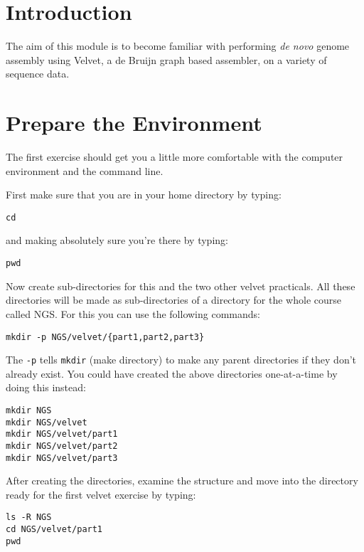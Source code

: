 \newpage

\section{Introduction}
The aim of this module is to become familiar with performing \textit{de novo}
genome assembly using Velvet, a de Bruijn graph based assembler, on a variety of
sequence data.

\section{Prepare the Environment}
\begin{information}
The first exercise should get you a little more comfortable with the computer
environment and the command line.
\end{information}

\begin{steps}
First make sure that you are in your home directory by typing:
\begin{lstlisting}
cd
\end{lstlisting}

and making absolutely sure you're there by typing:
\begin{lstlisting}
pwd
\end{lstlisting}

Now create sub-directories for this and the two other velvet practicals. All
these directories will be made as sub-directories of a directory for the whole
course called NGS. For this you can use the following commands:
\begin{lstlisting}
mkdir -p NGS/velvet/{part1,part2,part3}
\end{lstlisting}
\end{steps}

\begin{information}
The \texttt{-p} tells \texttt{mkdir} (make directory) to make any parent
directories if they don't already exist. You could have created the above directories one-at-a-time
by doing this instead:
\begin{lstlisting}
mkdir NGS
mkdir NGS/velvet
mkdir NGS/velvet/part1
mkdir NGS/velvet/part2
mkdir NGS/velvet/part3
\end{lstlisting}
\end{information}

\begin{steps}
After creating the directories, examine the structure and move into the
directory ready for the first velvet exercise by typing:
\begin{lstlisting}
ls -R NGS
cd NGS/velvet/part1
pwd
\end{lstlisting}

\end{steps}

